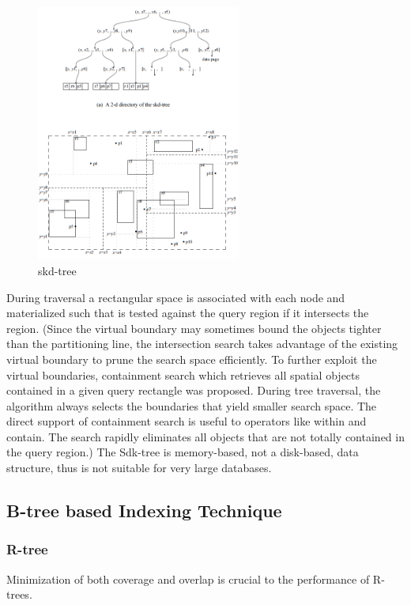 \documentclass[a4paper,12pt]{article}
\begin{document}
\begin{figure}
\centering
\includegraphics[width=0.6\textwidth]{skdtree}
\caption{skd-tree}
\label{figskdtree}
\end{figure}

During traversal a rectangular space is associated with each node and materialized  such that is tested against the query region if it intersects the region. 
(Since the virtual boundary may sometimes bound the objects tighter than the partitioning line, the intersection search takes advantage of the existing virtual boundary to prune the search space efficiently. To further exploit the virtual boundaries, containment search which retrieves all spatial objects contained in a given query rectangle was proposed. During tree traversal, the algorithm always selects the boundaries that yield smaller search space. The direct support of containment search is useful to operators like within and contain. The search rapidly eliminates all objects that are not totally contained in the query region.)
The Sdk-tree is memory-based, not a disk-based, data structure, thus is not suitable for very large databases.

\subsection{B-tree based Indexing Technique}
\subsubsection{R-tree}

Minimization of both coverage and overlap is crucial to the performance of R-trees.
\end{document}
